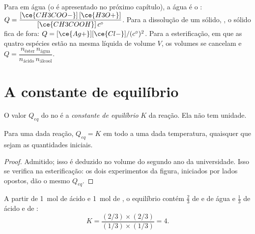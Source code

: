 \begin{example}\label{ex:g12:equilibrium:quotients}
Para  em água (o   é
apresentado no próximo capítulo), a água é o :
$Q = \dfrac{[\ce{CH3COO-}]\,[\ce{H3O+}]}{[\ce{CH3COOH}]\,c^\circ}$. Para a
dissolução de um sólido, , o sólido fica de fora:
$Q = [\ce{Ag+}][\ce{Cl-}]/(c^\circ)^2$. Para a esterificação, em que as
quatro espécies estão na mesma  líquida de volume $V$, os volumes
se cancelam e $Q = \dfrac{n_{\text{éster}}\, n_{\text{água}}}{n_{\text{ácido}}\, n_{\text{álcool}}}$.
\end{example}

\section{A constante de equilíbrio}

\begin{definition}\label{def:g12:equilibrium:constant}
O valor $Q_{eq}$ do  no  é a
\emph{constante de equilíbrio} $K$ da
reação. Ela não tem unidade.
\end{definition}

\begin{proposition}\label{prop:g12:equilibrium:constant}
Para uma dada reação, $Q_{eq} = K$ em todo  a uma
dada temperatura, quaisquer que sejam as quantidades iniciais.
\end{proposition}

\begin{proof}
Admitido; isso é deduzido no volume do segundo ano da universidade. Isso
se verifica na esterificação: os dois experimentos da figura, iniciados
por lados opostos, dão o mesmo $Q_{eq}$.
\end{proof}

\begin{example}[O $K$ da esterificação]\label{ex:g12:equilibrium:k-ester}
A partir de \qty{1}{mol} de ácido e \qty{1}{mol} de , o equilíbrio
contém $\frac{2}{3}$  de  e de água e $\frac{1}{3}$  de
ácido e de :
\[
  K = \frac{(2/3)\times(2/3)}{(1/3)\times(1/3)} = 4 .
\]
\end{example}

